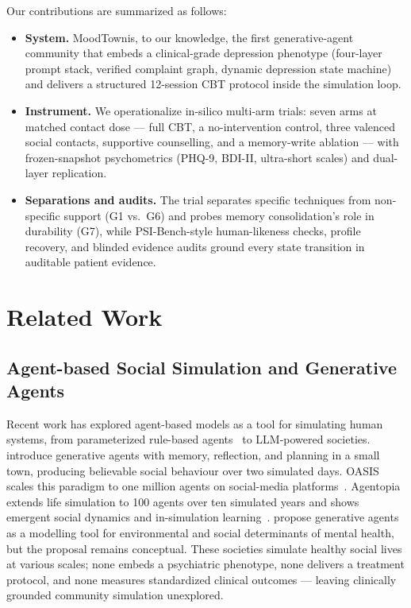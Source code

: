 \documentclass[10pt]{article}
\newcommand{\sys}{MoodTown}
\begin{document}
Our contributions are summarized as follows:
\begin{itemize}
\item \textbf{System.} \sys is, to our knowledge, the first generative-agent community that embeds a clinical-grade depression phenotype (four-layer prompt stack, verified complaint graph, dynamic depression state machine) and delivers a structured 12-session CBT protocol inside the simulation loop.
\item \textbf{Instrument.} We operationalize in-silico multi-arm trials: seven arms at matched contact dose --- full CBT, a no-intervention control, three valenced social contacts, supportive counselling, and a memory-write ablation --- with frozen-snapshot psychometrics (PHQ-9, BDI-II, ultra-short scales) and dual-layer replication.
\item \textbf{Separations and audits.} The trial separates specific techniques from non-specific support (G1 vs.\ G6) and probes memory consolidation's role in durability (G7), while PSI-Bench-style human-likeness checks, profile recovery, and blinded evidence audits ground every state transition in auditable patient evidence.
\end{itemize}

\section{Related Work}\label{sec:related}

\subsection{Agent-based Social Simulation and Generative Agents}\label{sec:related-abm}

Recent work has explored agent-based models as a tool for simulating human systems, from parameterized rule-based agents~\citep{bonabeau2002} to LLM-powered societies.
\citet{park2023} introduce generative agents with memory, reflection, and planning in a small town, producing believable social behaviour over two simulated days.
OASIS scales this paradigm to one million agents on social-media platforms~\citep{oasis2024}.
Agentopia extends life simulation to 100 agents over ten simulated years and shows emergent social dynamics and in-simulation learning~\citep{agentopia2026}.
\citet{kambeitz2025} propose generative agents as a modelling tool for environmental and social determinants of mental health, but the proposal remains conceptual.
These societies simulate healthy social lives at various scales; none embeds a psychiatric phenotype, none delivers a treatment protocol, and none measures standardized clinical outcomes --- leaving clinically grounded community simulation unexplored.
\end{document}
